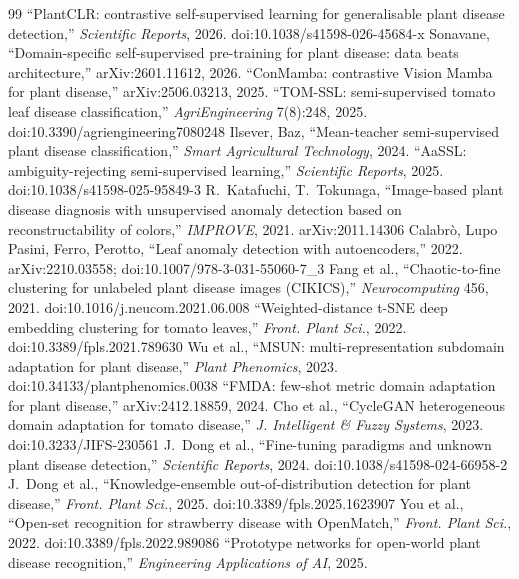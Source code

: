 \begin{thebibliography}{99}
 ``PlantCLR: contrastive self-supervised learning for generalisable plant disease detection,'' \emph{Scientific Reports}, 2026. doi:10.1038/s41598-026-45684-x
 Sonavane, ``Domain-specific self-supervised pre-training for plant disease: data beats architecture,'' arXiv:2601.11612, 2026.
 ``ConMamba: contrastive Vision Mamba for plant disease,'' arXiv:2506.03213, 2025.
 ``TOM-SSL: semi-supervised tomato leaf disease classification,'' \emph{AgriEngineering} 7(8):248, 2025. doi:10.3390/agriengineering7080248
 Ilsever, Baz, ``Mean-teacher semi-supervised plant disease classification,'' \emph{Smart Agricultural Technology}, 2024.
 ``AaSSL: ambiguity-rejecting semi-supervised learning,'' \emph{Scientific Reports}, 2025. doi:10.1038/s41598-025-95849-3
 R.~Katafuchi, T.~Tokunaga, ``Image-based plant disease diagnosis with unsupervised anomaly detection based on reconstructability of colors,'' \emph{IMPROVE}, 2021. arXiv:2011.14306
 Calabr\`o, Lupo Pasini, Ferro, Perotto, ``Leaf anomaly detection with autoencoders,'' 2022. arXiv:2210.03558; doi:10.1007/978-3-031-55060-7\_3
 Fang et al., ``Chaotic-to-fine clustering for unlabeled plant disease images (CIKICS),'' \emph{Neurocomputing} 456, 2021. doi:10.1016/j.neucom.2021.06.008
 ``Weighted-distance t-SNE deep embedding clustering for tomato leaves,'' \emph{Front. Plant Sci.}, 2022. doi:10.3389/fpls.2021.789630
 Wu et al., ``MSUN: multi-representation subdomain adaptation for plant disease,'' \emph{Plant Phenomics}, 2023. doi:10.34133/plantphenomics.0038
 ``FMDA: few-shot metric domain adaptation for plant disease,'' arXiv:2412.18859, 2024.
 Cho et al., ``CycleGAN heterogeneous domain adaptation for tomato disease,'' \emph{J. Intelligent \& Fuzzy Systems}, 2023. doi:10.3233/JIFS-230561
 J.~Dong et al., ``Fine-tuning paradigms and unknown plant disease detection,'' \emph{Scientific Reports}, 2024. doi:10.1038/s41598-024-66958-2
 J.~Dong et al., ``Knowledge-ensemble out-of-distribution detection for plant disease,'' \emph{Front. Plant Sci.}, 2025. doi:10.3389/fpls.2025.1623907
 You et al., ``Open-set recognition for strawberry disease with OpenMatch,'' \emph{Front. Plant Sci.}, 2022. doi:10.3389/fpls.2022.989086
 ``Prototype networks for open-world plant disease recognition,'' \emph{Engineering Applications of AI}, 2025.

\end{thebibliography}
